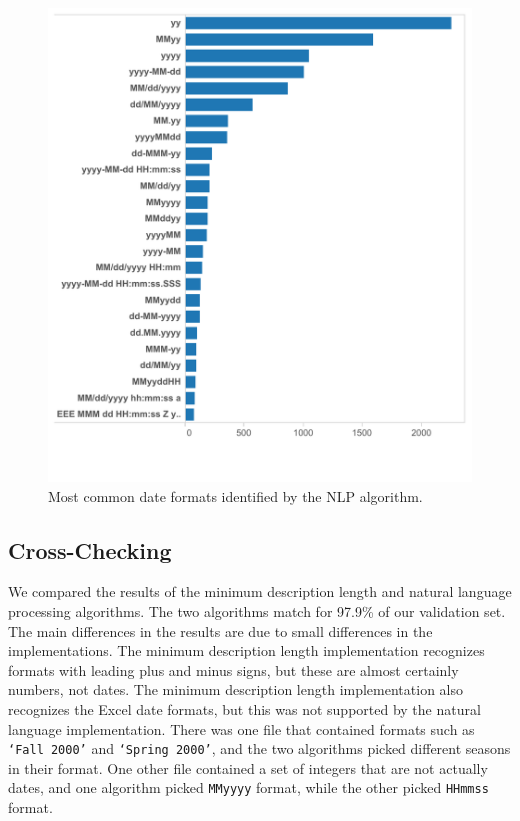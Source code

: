 \begin{figure}[ht]
\centering
\includegraphics[width=\columnwidth]{figures/FigureNLP1}
\caption{Most common date formats identified by the NLP algorithm.}
\label{fig:NLP1}
\end{figure}

\subsection{Cross-Checking}
We compared the results of the minimum description length and natural language processing algorithms. The two algorithms match for 97.9\% of our validation set. The main differences in the results are due to small differences in the implementations. The minimum description length implementation recognizes formats with leading plus and minus signs, but these are almost certainly numbers, not dates. The minimum description length implementation also recognizes the Excel date formats, but this was not supported by the natural language implementation. There was one file that contained formats such as \texttt{`Fall 2000'} and \texttt{`Spring 2000'}, and the two algorithms picked different seasons in their format. One other file contained a set of integers that are not actually dates, and one algorithm picked \texttt{MMyyyy} format, while the other picked \texttt{HHmmss} format.
